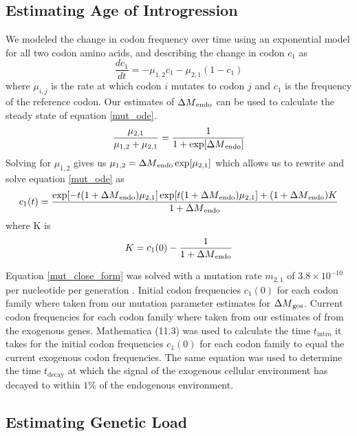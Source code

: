 \documentclass[fleqn,letterpaper]{article}
\begin{document}
\subsection*{Estimating Age of Introgression}
We modeled the change in codon frequency over time using an exponential model for all two codon amino acids, and describing the change in codon $c_1$ as
\begin{equation}
\frac{d c_1}{d t} = -\mu_{1,2}c_1 - \mu_{2,1}(1-c_1)
\label{mut_ode}
\end{equation}
where $\mu_{i,j}$ is the rate at which codon $i$ mutates to codon $j$ and $c_1$ is the frequency of the reference codon.
Our estimates of ${\Delta M}_\text{endo}$ can be used to calculate the steady state of equation \ref{mut_ode}.
\begin{equation}
\frac{\mu_{2,1}}{\mu_{1,2} + \mu_{2,1}} = \frac{1}{1+\exp[{\Delta M}_\text{endo}]}
\end{equation}
Solving for $\mu_{1,2}$ gives us $\mu_{1,2} = {\Delta M}_\text{endo}\exp[\mu_{2,1}]$ which allows us to rewrite and solve equation \ref{mut_ode} as
\begin{equation}
c_1(t) = \frac{\exp[-t(1+{\Delta M}_\text{endo})\mu_{2,1}]\exp[t(1+{\Delta M}_\text{endo})\mu_{2,1}] + (1+{\Delta M}_\text{endo})K}{1+{\Delta M}_\text{endo}}
\label{mut_close_form}
\end{equation}
where K is
\begin{equation}
K = c_1(0) - \frac{1}{1+{\Delta M}_\text{endo}}
\end{equation}

Equation \ref{mut_close_form} was solved with a mutation rate $m_{2,1}$ of $3.8\times 10^{-10}$ per nucleotide per generation \citep{lang2008}. 
Initial codon frequencies $c_1(0)$ for each codon family where taken from our mutation parameter estimates for \gossypii ${\Delta M}_\text{gos}$. 
Current codon frequencies for each codon family where taken from our estimates of \DM from the exogenous genes.
Mathematica (11.3) \citep{Mathematica11} was used to calculate the time $t_\text{intro}$ it takes for the initial codon frequencies $c_1(0)$ for each codon family to equal the current exogenous codon frequencies.
The same equation was used to determine the time $t_\text{decay}$ at which the signal of the exogenous cellular environment has decayed to within $1 \%$ of the endogenous environment.

\subsection*{Estimating Genetic Load}
\end{document}
